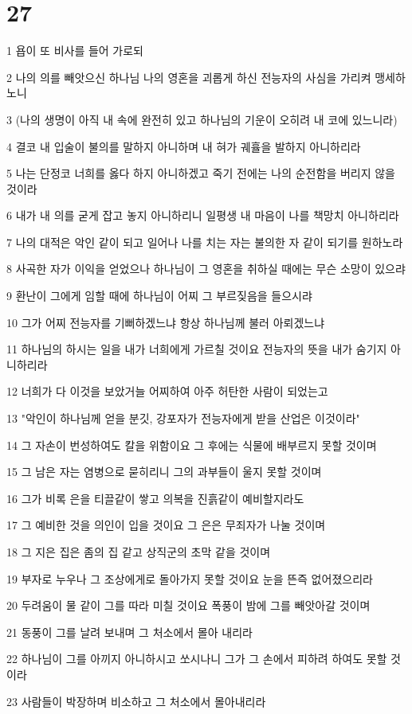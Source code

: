 \chapter{27}

\par 1 욥이 또 비사를 들어 가로되
\par 2 나의 의를 빼앗으신 하나님 나의 영혼을 괴롭게 하신 전능자의 사심을 가리켜 맹세하노니
\par 3 (나의 생명이 아직 내 속에 완전히 있고 하나님의 기운이 오히려 내 코에 있느니라)
\par 4 결코 내 입술이 불의를 말하지 아니하며 내 혀가 궤휼을 발하지 아니하리라
\par 5 나는 단정코 너희를 옳다 하지 아니하겠고 죽기 전에는 나의 순전함을 버리지 않을 것이라
\par 6 내가 내 의를 굳게 잡고 놓지 아니하리니 일평생 내 마음이 나를 책망치 아니하리라
\par 7 나의 대적은 악인 같이 되고 일어나 나를 치는 자는 불의한 자 같이 되기를 원하노라
\par 8 사곡한 자가 이익을 얻었으나 하나님이 그 영혼을 취하실 때에는 무슨 소망이 있으랴
\par 9 환난이 그에게 임할 때에 하나님이 어찌 그 부르짖음을 들으시랴
\par 10 그가 어찌 전능자를 기뻐하겠느냐 항상 하나님께 불러 아뢰겠느냐
\par 11 하나님의 하시는 일을 내가 너희에게 가르칠 것이요 전능자의 뜻을 내가 숨기지 아니하리라
\par 12 너희가 다 이것을 보았거늘 어찌하여 아주 허탄한 사람이 되었는고
\par 13 "악인이 하나님께 얻을 분깃, 강포자가 전능자에게 받을 산업은 이것이라"
\par 14 그 자손이 번성하여도 칼을 위함이요 그 후에는 식물에 배부르지 못할 것이며
\par 15 그 남은 자는 염병으로 묻히리니 그의 과부들이 울지 못할 것이며
\par 16 그가 비록 은을 티끌같이 쌓고 의복을 진흙같이 예비할지라도
\par 17 그 예비한 것을 의인이 입을 것이요 그 은은 무죄자가 나눌 것이며
\par 18 그 지은 집은 좀의 집 같고 상직군의 초막 같을 것이며
\par 19 부자로 누우나 그 조상에게로 돌아가지 못할 것이요 눈을 뜬즉 없어졌으리라
\par 20 두려움이 물 같이 그를 따라 미칠 것이요 폭풍이 밤에 그를 빼앗아갈 것이며
\par 21 동풍이 그를 날려 보내며 그 처소에서 몰아 내리라
\par 22 하나님이 그를 아끼지 아니하시고 쏘시나니 그가 그 손에서 피하려 하여도 못할 것이라
\par 23 사람들이 박장하며 비소하고 그 처소에서 몰아내리라

